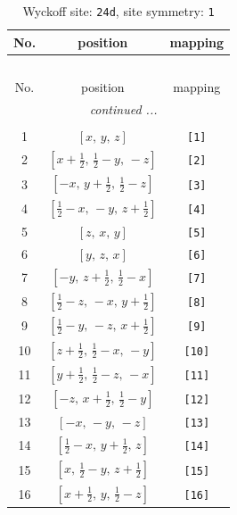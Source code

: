 \documentclass[fleqn,8pt]{jsarticle}
\begin{document}
\begin{longtable}{ccc}
\caption{Wyckoff site: {\tt 24d}, site symmetry: {\tt 1}}
 \\
 \hline \hline
No. & position & mapping \\ \hline \endfirsthead

\multicolumn{2}{l}{\tablename\ \thetable{}} \\
 \hline \hline
No. & position & mapping \\ \hline \endhead

 \hline \hline
\multicolumn{2}{r}{\footnotesize\it continued ...} \\ \endfoot

 \hline \hline
\multicolumn{2}{r}{} \\ \endlastfoot

1 & $\left[ x,\, y,\, z \right]$ & {\tt [1]} \\ \hline
2 & $\left[ x + \frac{1}{2},\, \frac{1}{2} - y,\, - z \right]$ & {\tt [2]} \\ \hline
3 & $\left[ - x,\, y + \frac{1}{2},\, \frac{1}{2} - z \right]$ & {\tt [3]} \\ \hline
4 & $\left[ \frac{1}{2} - x,\, - y,\, z + \frac{1}{2} \right]$ & {\tt [4]} \\ \hline
5 & $\left[ z,\, x,\, y \right]$ & {\tt [5]} \\ \hline
6 & $\left[ y,\, z,\, x \right]$ & {\tt [6]} \\ \hline
7 & $\left[ - y,\, z + \frac{1}{2},\, \frac{1}{2} - x \right]$ & {\tt [7]} \\ \hline
8 & $\left[ \frac{1}{2} - z,\, - x,\, y + \frac{1}{2} \right]$ & {\tt [8]} \\ \hline
9 & $\left[ \frac{1}{2} - y,\, - z,\, x + \frac{1}{2} \right]$ & {\tt [9]} \\ \hline
10 & $\left[ z + \frac{1}{2},\, \frac{1}{2} - x,\, - y \right]$ & {\tt [10]} \\ \hline
11 & $\left[ y + \frac{1}{2},\, \frac{1}{2} - z,\, - x \right]$ & {\tt [11]} \\ \hline
12 & $\left[ - z,\, x + \frac{1}{2},\, \frac{1}{2} - y \right]$ & {\tt [12]} \\ \hline
13 & $\left[ - x,\, - y,\, - z \right]$ & {\tt [13]} \\ \hline
14 & $\left[ \frac{1}{2} - x,\, y + \frac{1}{2},\, z \right]$ & {\tt [14]} \\ \hline
15 & $\left[ x,\, \frac{1}{2} - y,\, z + \frac{1}{2} \right]$ & {\tt [15]} \\ \hline
16 & $\left[ x + \frac{1}{2},\, y,\, \frac{1}{2} - z \right]$ & {\tt [16]} \\ \hline

\end{longtable}
\end{document}
